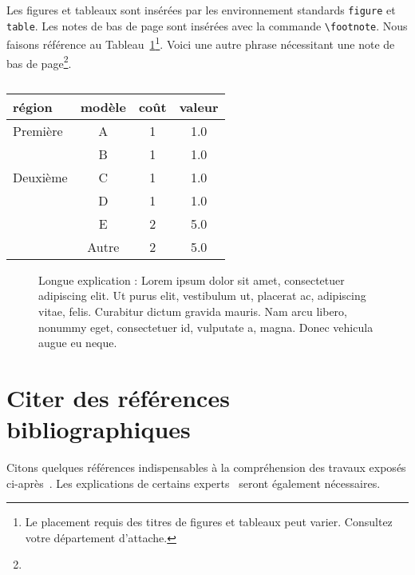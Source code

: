 Les figures et tableaux sont insérées par les environnement standards \verb|figure| et \verb|table|.
Les notes de bas de page sont insérées avec la commande \verb|\footnote|.
Nous faisons référence au Tableau~\ref{tab:tableau1}\footnote{Le placement requis des titres de figures et tableaux peut varier. Consultez votre département d'attache.}.
Voici une autre phrase nécessitant une note de bas de page\footnote{\lipsum[1]}.

\lipsum[4-6]

\begin{table}
    \centering 
    \begin{tabular}{lccc}
        \hline
        région & modèle & coût & valeur \\
        \hline
         Première & A & 1 & 1.0\\
          & B & 1 & 1.0\\
         Deuxième & C & 1 & 1.0\\
          & D & 1 & 1.0\\
         & E & 2 & 5.0 \\
        \hline
         & Autre & 2 & 5.0 \\
        \hline
    \end{tabular}
    \caption[Titre court pour liste des tableaux]{\lipsum[1]}
    \label{tab:tableau1}
\end{table}


\begin{figure}
    \centering
    
    \caption[Titre court pour la liste des figures]{Longue explication :  Lorem ipsum dolor sit amet, consectetuer adipiscing elit. Ut purus elit, vestibulum ut, placerat ac, adipiscing vitae, felis. Curabitur dictum gravida mauris. Nam arcu libero, nonummy eget, consectetuer id, vulputate a, magna. Donec vehicula augue eu neque. }
    \label{fig:figure2}
\end{figure}



\section{Citer des références bibliographiques}


Citons quelques références indispensables à la compréhension des travaux exposés ci-après~\cite{gingras1991institutionnalisation,glardon2010analyse}.
Les explications de certains experts~\cite{mcneil2019grand, messier1989influence} seront également nécessaires.